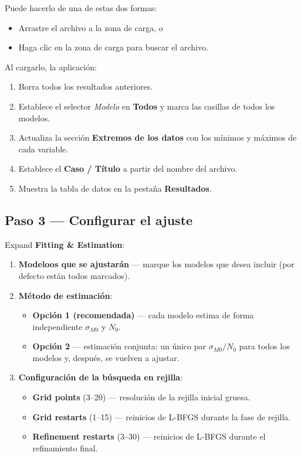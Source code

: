 \documentclass[11pt,a4paper]{article}
\newcommand{\sMzero}{\ensuremath{\sigma_{M0}}}
\newcommand{\Nzero}{\ensuremath{N_0}}
\begin{document}
Puede hacerlo de una de estas dos formas:
\begin{itemize}[leftmargin=1.4em]
  \item Arrastre el archivo a la zona de carga, o
  \item Haga clic en la zona de carga para buscar el archivo.
\end{itemize}

Al cargarlo, la aplicación:
\begin{enumerate}[leftmargin=1.4em]
  \item Borra todos los resultados anteriores.
  \item Establece el selector \textit{Modelo} en \textbf{Todos} y marca las casillas de todos los modelos.
  \item Actualiza la sección \textbf{Extremos de los datos} con los mínimos y máximos de cada variable.
  \item Establece el \textbf{Caso / Título} a partir del nombre del archivo.
  \item Muestra la tabla de datos en la pestaña \textbf{Resultados}.
\end{enumerate}

\subsection{Paso 3 --- Configurar el ajuste}

Expand \textbf{Fitting \& Estimation}:

\begin{enumerate}[leftmargin=1.4em]
  \item \textbf{Modeloos que se ajustarán} --- marque los modelos que desea incluir (por defecto están todos marcados).
  \item \textbf{Método de estimación}:
    \begin{itemize}
      \item \textbf{Opción 1 (recomendada)} --- cada modelo estima de forma independiente $\sMzero$ y $\Nzero$.
      \item \textbf{Opción 2} --- estimación conjunta: un único par $\sMzero/\Nzero$ para todos los modelos y, después, se vuelven a ajustar.
    \end{itemize}
  \item \textbf{Configuración de la búsqueda en rejilla}:
    \begin{itemize}
      \item \textbf{Grid points} (3--20) --- resolución de la rejilla inicial gruesa.
      \item \textbf{Grid restarts} (1--15) --- reinicios de L-BFGS durante la fase de rejilla.
      \item \textbf{Refinement restarts} (3--30) --- reinicios de L-BFGS durante el refinamiento final.
    \end{itemize}
\end{enumerate}
\end{document}
